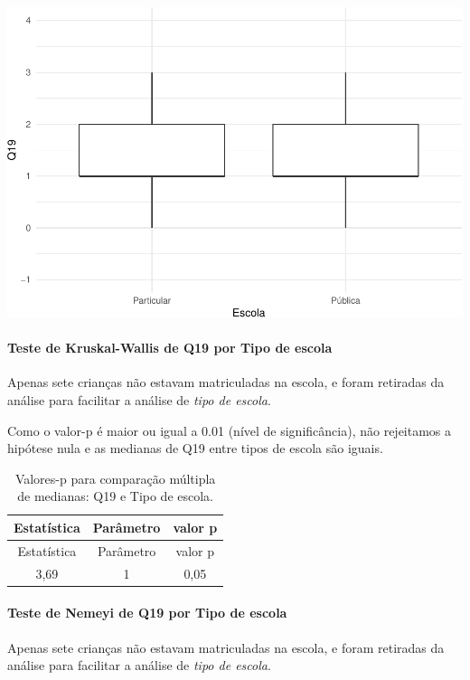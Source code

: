 \documentclass[]{article}
\let\oldparagraph\paragraph
\renewcommand{\paragraph}[1]{\oldparagraph{#1}\mbox{}}
\begin{document}
\begin{center}\includegraphics[width=0.75\linewidth]{relatorio_covid19_files/figure-latex/unnamed-chunk-352-1} \end{center}

\hypertarget{teste-de-kruskal-wallis-de-q19-por-tipo-de-escola}{%
\paragraph{Teste de Kruskal-Wallis de Q19 por Tipo de escola}\label{teste-de-kruskal-wallis-de-q19-por-tipo-de-escola}}

Apenas sete crianças não estavam matriculadas na escola, e foram retiradas da análise para facilitar a análise de \emph{tipo de escola}.

Como o valor-p é maior ou igual a 0.01 (nível de significância), não rejeitamos a hipótese nula e as medianas de Q19 entre tipos de escola são iguais.

\begin{longtable}[]{@{}ccc@{}}
\caption{\label{tab:unnamed-chunk-354}Valores-p para comparação múltipla de medianas: Q19 e Tipo de escola.}\tabularnewline
\toprule
Estatística & Parâmetro & valor p\tabularnewline
\midrule
\endfirsthead
\toprule
Estatística & Parâmetro & valor p\tabularnewline
\midrule
\endhead
3,69 & 1 & 0,05\tabularnewline
\bottomrule
\end{longtable}

\hypertarget{teste-de-nemeyi-de-q19-por-tipo-de-escola}{%
\paragraph{Teste de Nemeyi de Q19 por Tipo de escola}\label{teste-de-nemeyi-de-q19-por-tipo-de-escola}}

Apenas sete crianças não estavam matriculadas na escola, e foram retiradas da análise para facilitar a análise de \emph{tipo de escola}.
\end{document}
